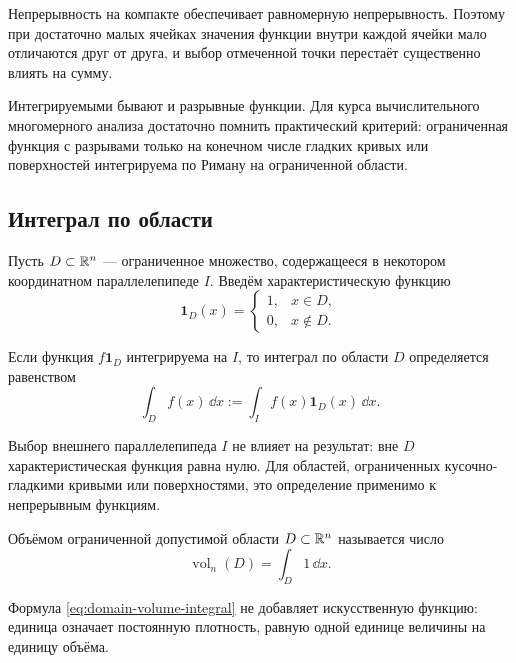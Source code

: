 Непрерывность на компакте обеспечивает равномерную непрерывность. Поэтому при достаточно малых ячейках значения функции внутри каждой ячейки мало отличаются друг от друга, и выбор отмеченной точки перестаёт существенно влиять на сумму.

\begin{remark}
Интегрируемыми бывают и разрывные функции. Для курса вычислительного многомерного анализа достаточно помнить практический критерий: ограниченная функция с разрывами только на конечном числе гладких кривых или поверхностей интегрируема по Риману на ограниченной области.
\end{remark}

\subsection{Интеграл по области}

Пусть $D\subset\mathbb{R}^n$ --- ограниченное множество, содержащееся в некотором координатном параллелепипеде $I$. Введём характеристическую функцию
\[
\mathbf 1_D(x)
=
\begin{cases}
1,&x\in D,\\
0,&x\notin D.
\end{cases}
\]

\begin{definition}
Если функция $f\mathbf 1_D$ интегрируема на $I$, то интеграл по области $D$ определяется равенством
\begin{equation}
\int_D f(x)\,\dd x
:=
\int_I f(x)\mathbf 1_D(x)\,\dd x.
\label{eq:integral-over-domain}
\end{equation}
\end{definition}

Выбор внешнего параллелепипеда $I$ не влияет на результат: вне $D$ характеристическая функция равна нулю. Для областей, ограниченных кусочно-гладкими кривыми или поверхностями, это определение применимо к непрерывным функциям.

\begin{definition}
Объёмом ограниченной допустимой области $D\subset\mathbb{R}^n$ называется число
\begin{equation}
\operatorname{vol}_n(D)
=
\int_D 1\,\dd x.
\label{eq:domain-volume-integral}
\end{equation}
\end{definition}

Формула \eqref{eq:domain-volume-integral} не добавляет искусственную функцию: единица означает постоянную плотность, равную одной единице величины на единицу объёма.

